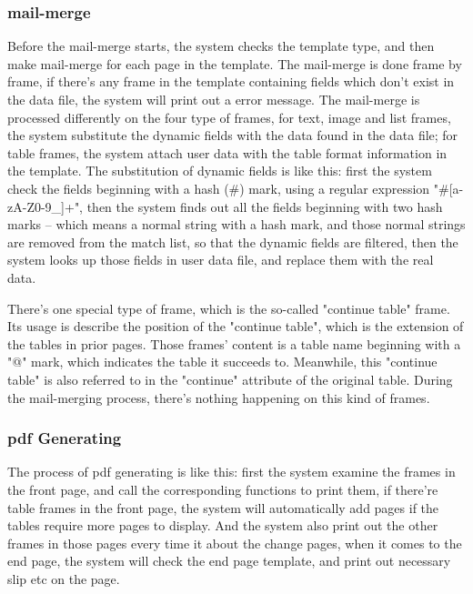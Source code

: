 \documentclass[12pt,twoside,a4paper]{report}
\begin{document}
\subsubsection{mail-merge}

  Before the mail-merge starts, the system checks the template type, and then make mail-merge for each page in the template. The mail-merge is done frame by frame, if there's any frame in the template containing fields which don't exist in the data file, the system will print out a error message. The mail-merge is processed differently on the four type of frames, for text, image and list frames, the system substitute the dynamic fields with the data found in the data file; for table frames, the system attach user data with the table format information in the template. The substitution of dynamic fields is like this: first the system check the fields beginning with a hash (\#) mark, using a regular expression "\#[a-zA-Z0-9\_]+", then the system finds out all the fields beginning with two hash marks -- which means a normal string with a hash mark, and those normal strings are removed from the match list, so that the dynamic fields are filtered, then the system looks up those fields in user data file, and replace them with the real data. 

  There's one special type of frame, which is the so-called "continue table" frame. Its usage is describe the position of the "continue table", which is the extension of the tables in prior pages. Those frames' content is a table name beginning with a "@" mark, which indicates the table it succeeds to. Meanwhile, this "continue table" is also referred to in the "continue" attribute of the original table. During the mail-merging process, there's nothing happening on this kind of frames.

\subsubsection{pdf Generating}
  
  The process of pdf generating is like this: first the system examine the frames in the front page, and call the corresponding functions to print them, if there're table frames in the front page, the system will automatically add pages if the tables require more pages to display. And the system also print out the other frames in those pages every time it about the change pages, when it comes to the end page, the system will check the end page template, and print out necessary slip etc on the page. 
\end{document}
